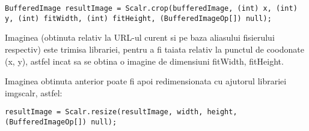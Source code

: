 \begin{lstlisting}[breaklines=true]
BufferedImage resultImage = Scalr.crop(bufferedImage, (int) x, (int) y, (int) fitWidth, (int) fitHeight, (BufferedImageOp[]) null);
\end{lstlisting}	

Imaginea (obtinuta relativ la URL-ul curent si pe baza aliasului fisierului respectiv) este trimisa librariei, pentru a fi taiata relativ la punctul de coodonate (x, y), astfel incat sa se obtina o imagine de dimensiuni fitWidth, fitHeight.

Imaginea obtinuta anterior poate fi apoi redimensionata cu ajutorul librariei imgscalr, astfel:

\begin{lstlisting}[breaklines=true]
resultImage = Scalr.resize(resultImage, width, height, (BufferedImageOp[]) null);  
\end{lstlisting}	




